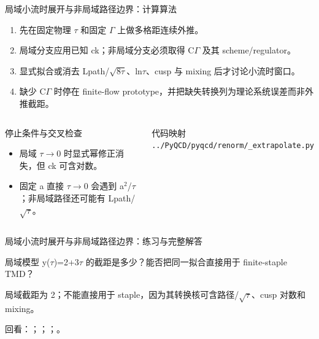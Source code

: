 \begin{frame}[t]{局域小流时展开与非局域路径边界：计算算法}
\footnotesize
{}\begin{enumerate}
\item 先在固定物理 \ensuremath{\tau} 和固定 \ensuremath{\Gamma} 上做多格距连续外推。
\item 局域分支应用已知 ck；非局域分支必须取得 C\ensuremath{\Gamma} 及其 scheme/\allowbreak{}regulator。
\item 显式拟合或消去 Lpath/\allowbreak{}\ensuremath{\sqrt{8\tau}}、ln\ensuremath{\tau}、cusp 与 mixing 后才讨论小流时窗口。
\item 缺少 C\ensuremath{\Gamma} 时停在 finite-flow prototype，并把缺失转换列为理论系统误差而非外推截距。
\end{enumerate}\begin{columns}[T,onlytextwidth]
\begin{block}{停止条件与交叉检查}\scriptsize\begin{itemize}
\item[\CheckMark] 局域 \ensuremath{\tau}\ensuremath{\rightarrow}0 时显式幂修正消失，但 ck 可含对数。
\item[\CheckMark] 固定 a 直接 \ensuremath{\tau}\ensuremath{\rightarrow}0 会遇到 a\ensuremath{^{2}}/\allowbreak{}\ensuremath{\tau}；非局域路径还可能有 Lpath/\allowbreak{}\ensuremath{\sqrt{\tau}}。
\end{itemize}\end{block}
\begin{block}{代码映射}
\scriptsize \texttt{.\allowbreak{}.\allowbreak{}/\allowbreak{}PyQCD/\allowbreak{}pyqcd/\allowbreak{}renorm/\allowbreak{}\_\allowbreak{}extrapolate.\allowbreak{}py}
\end{block}\end{columns}\end{frame}

\begin{frame}[t]{局域小流时展开与非局域路径边界：练习与完整解答}
\footnotesize
\begin{block}{}局域模型 y(\ensuremath{\tau})=2+3\ensuremath{\tau} 的截距是多少？能否把同一拟合直接用于 finite-staple TMD？\end{block}
\begin{exampleblock}{}局域截距为 2；不能直接用于 staple，因为其转换核可含路径/\allowbreak{}\ensuremath{\sqrt{\tau}}、cusp 对数和 mixing。\end{exampleblock}
\vfill
\scriptsize 回看：；；；。
\end{frame}

